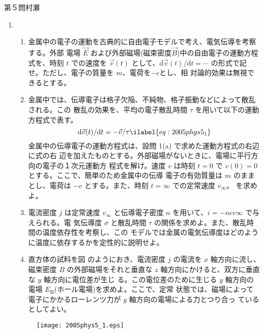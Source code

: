 \begin{question}{第５問}{村瀬}
\begin{enumerate}
\item
  \begin{enumerate}
  \item
    金属中の電子の運動を古典的に自由電子モデルで考え、電気伝導を考察する。外部
    電場 $\vec E$ および外部磁場(磁束密度$\vec B$)中の自由電子の運動方程式を、時刻 $t$ での速度を
    $\vec v(t)$ として、$\mathrm d\vec v(t)/\mathrm dt=\cdots$ の形式で記せ。ただし、電子の質量を $m$、電荷を$-\epsilon$とし、相
    対論的効果は無視できるとする。
  \item
    金属中では、伝導電子は格子欠陥、不純物、格子振動などによって散乱される。この
    散乱の効果を、平均の電子散乱時間 $\tau$ を用いて以下の運動方程式で表す。
    \begin{equation}
    \mathrm d\vec v(t)/\mathrm dt=-\vec v/\tau \ilabel{eq:2005phys5_1}
    \end{equation}
    金属中の伝導電子の運動方程式は、設問 1(a) で求めた運動方程式の右辺に式の右
    辺を加えたものとする。外部磁場がないときに、電場に平行方向の電子の１次元運動方
    程式を解け。速度 $v$ は時刻 $t=0$ で $v(0)=0$ とする。ここで、簡単のため金属中の伝導
    電子の有効質量は $m$ のままとし、電荷は $-e$ とする。また、時刻 $t=\infty$ での定常速度 $v_\infty$。
    を求めよ。
  \item
    電流密度 $j$ は定常速度 $v_\infty$ と伝導電子密度 $n$ を用いて、$i=-n\epsilon v\infty$ で与えられる。電
    気伝導度 $\sigma$ と散乱時間 $\tau$ の関係を求めよ。また、散乱時間の温度依存性を考察し、この
    モデルでは金属の電気伝導度はどのように温度に依存するかを定性的に説明せよ。
  \item
    直方体の試料を図  のようにおき、電流密度 $j$ の電流を $x$ 軸方向に流し、磁束密度 $B$
    の外部磁場をそれと垂直な $z$ 軸方向にかけると、双方に垂直な $y$ 軸方向に電位差が生じ
    る。この電位差のために生じる $y$ 軸方向の電場 $E_\mathrm{H}$(ホール電場)を求めよ。ここで、定常
    状態では、磁場によって電子にかかるローレンツ力が $y$ 軸方向の電場による力とつり合っ
    ているとしてよい。
  \end{enumerate}
  \begin{figure}[b]
  \begin{center}
  \texttt{[image: 2005phys5\_1.eps]}

\end{center}
\end{figure}
\end{enumerate}
\end{question}
